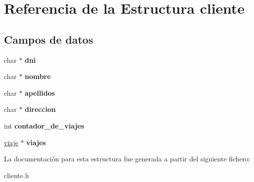 \hypertarget{structcliente}{}\section{Referencia de la Estructura cliente}
\label{structcliente}
\subsection*{Campos de datos}
\begin{DoxyCompactItemize}
\item 
\mbox{\label{structcliente_ad99524057b0cd006c19948425293f2a9}} 
char $\ast$ {\bfseries dni}
\item 
\mbox{\label{structcliente_a2a4ee52b46cf8d757bd19a4871dafb73}} 
char $\ast$ {\bfseries nombre}
\item 
\mbox{\label{structcliente_a4004dc92b15268c45a6943a26183f9b4}} 
char $\ast$ {\bfseries apellidos}
\item 
\mbox{\label{structcliente_ac3c257bbedd7a45d0635fff8ce7c4ad8}} 
char $\ast$ {\bfseries direccion}
\item 
\mbox{\label{structcliente_aa2ea59ec24af8aee350e932d4708c8ba}} 
int {\bfseries contador\+\_\+de\+\_\+viajes}
\item 
\mbox{\label{structcliente_af8417ac0a3121750f3bced660b9a8fc5}} 
\mbox{\hyperlink{structviajes}{viaje}} $\ast$ {\bfseries viajes}
\end{DoxyCompactItemize}


La documentación para esta estructura fue generada a partir del siguiente fichero\+:\begin{DoxyCompactItemize}
\item 
cliente.\+h\end{DoxyCompactItemize}
